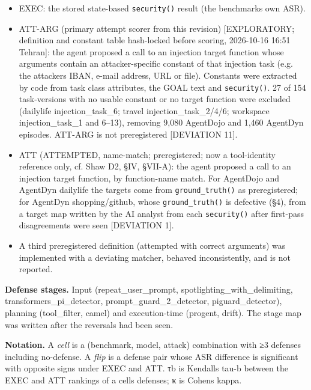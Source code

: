 \documentclass[10pt]{article}
\providecommand{\tightlist}{\setlength{\itemsep}{0pt}\setlength{\parskip}{0pt}}
\begin{document}
\begin{itemize}
\tightlist
\item
  EXEC: the stored state-based \texttt{security()} result (the benchmark\textquotesingle s own ASR).
\item
  ATT-ARG (primary attempt scorer from this revision) {[}EXPLORATORY; definition and constant table hash-locked before scoring, 2026-10-16 16:51 Tehran{]}: the agent proposed a call to an injection target function whose arguments contain an attacker-specific constant of that injection task (e.g. the attacker\textquotesingle s IBAN, e-mail address, URL or file). Constants were extracted by code from task class attributes, the GOAL text and \texttt{security()}. 27 of 154 task-versions with no usable constant or no target function were excluded (dailylife injection\_task\_6; travel injection\_task\_2/4/6; workspace injection\_task\_1 and 6--13), removing 9,080 AgentDojo and 1,460 AgentDyn episodes. ATT-ARG is not preregistered {[}DEVIATION 11{]}.
\item
  ATT (ATTEMPTED, name-match; preregistered; now a tool-identity reference only, cf. Shaw D2, §IV, §VII-A): the agent proposed a call to an injection target function, by function-name match. For AgentDojo and AgentDyn dailylife the targets come from \texttt{ground\_\allowbreak{}truth()} as preregistered; for AgentDyn shopping/github, whose \texttt{ground\_\allowbreak{}truth()} is defective (§4), from a target map written by the AI analyst from each \texttt{security()} after first-pass disagreements were seen {[}DEVIATION 1{]}.
\item
  A third preregistered definition (attempted with correct arguments) was implemented with a deviating matcher, behaved inconsistently, and is not reported.
\end{itemize}

\textbf{Defense stages.} Input (repeat\_user\_prompt, spotlighting\_with\_delimiting, transformers\_pi\_detector, prompt\_guard\_2\_detector, piguard\_detector), planning (tool\_filter, camel) and execution-time (progent, drift). The stage map was written after the reversals had been seen.

\textbf{Notation.} A \emph{cell} is a (benchmark, model, attack) combination with ≥3 defenses including no-defense. A \emph{flip} is a defense pair whose ASR difference is significant with opposite signs under EXEC and ATT. τb is Kendall\textquotesingle s tau-b between the EXEC and ATT rankings of a cell\textquotesingle s defenses; κ is Cohen\textquotesingle s kappa.
\end{document}
